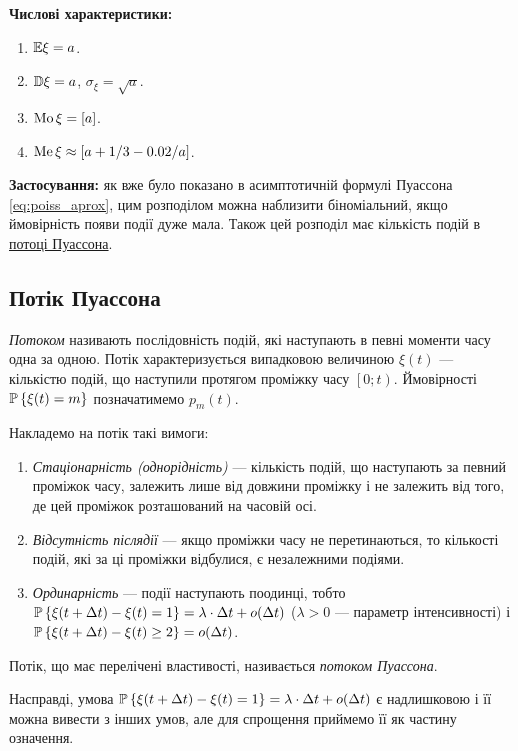 \noindent\textbf{Числові характеристики:}
\begin{enumerate}
    \item $\E\xi = a$.
    \item $\D\xi = a$, $\sigma_\xi = \sqrt{a}$.
    \item $\Mo\xi = \left[a\right]$.
    \item $\Me\xi \approx \left[a + 1/3 - 0.02/a\right]$.
\end{enumerate}

\noindent\textbf{Застосування:} як вже було показано в асимптотичній формулі Пуассона \eqref{eq:poiss_aprox},
цим розподілом можна наблизити біноміальний, якщо ймовірність появи події дуже мала. Також цей розподіл
має кількість подій в \hyperref[poiss_proc]{потоці Пуассона}.

\subsection{Потік Пуассона}\label{poiss_proc}
\emph{Потоком} називають послідовність подій, які наступають в певні моменти часу одна за одною.
Потік характеризується випадковою величиною $\xi(t)$ --- 
кількістю подій, що наступили протягом проміжку часу $\left[ 0; t\right)$.
Ймовірності $\P\left\{\xi(t) = m\right\}$ позначатимемо $p_m(t)$.

Накладемо на потік такі вимоги:
\begin{enumerate}
    \item \emph{Стаціонарність (однорідність)} --- кількість подій, що наступають
    за певний проміжок часу, залежить лише від довжини проміжку і не залежить
    від того, де цей проміжок розташований на часовій осі.
    \item \emph{Відсутність післядії} --- якщо проміжки часу не перетинаються, то кількості подій,
    які за ці проміжки відбулися, є незалежними подіями.
    \item \emph{Ординарність} --- події наступають поодинці, тобто
    $\P\left\{\xi(t+\Delta t) - \xi(t) = 1\right\} = \lambda\cdot\Delta t + o(\Delta t)$
    ($\lambda > 0$ --- параметр інтенсивності) і 
    $\P\left\{\xi(t+\Delta t) - \xi(t) \geq 2\right\} = o(\Delta t)$.
\end{enumerate}
\begin{definition}
    Потік, що має перелічені властивості, називається \emph{потоком Пуассона}.
\end{definition}
\begin{remark}
    Насправді, умова $\P\left\{\xi(t+\Delta t) - \xi(t) = 1\right\} = \lambda\cdot\Delta t + o(\Delta t)$
    є надлишковою і її можна вивести з інших умов, але для спрощення приймемо її як частину означення.
\end{remark}

